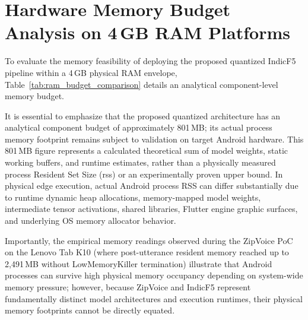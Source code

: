 \section{Hardware Memory Budget Analysis on \texorpdfstring{4\,GB}{4 GB} RAM Platforms}
To evaluate the memory feasibility of deploying the proposed quantized IndicF5 pipeline within a 4\,GB physical RAM envelope, Table~\ref{tab:ram_budget_comparison} details an analytical component-level memory budget. 

It is essential to emphasize that the proposed quantized architecture has an analytical component budget of approximately 801\,MB; its actual process memory footprint remains subject to validation on target Android hardware. This 801\,MB figure represents a calculated theoretical sum of model weights, static working buffers, and runtime estimates, rather than a physically measured process Resident Set Size (\acrshort{rss}) or an experimentally proven upper bound. In physical edge execution, actual Android process RSS can differ substantially due to runtime dynamic heap allocations, memory-mapped model weights, intermediate tensor activations, shared libraries, Flutter engine graphic surfaces, and underlying OS memory allocator behavior.

Importantly, the empirical memory readings observed during the ZipVoice PoC on the Lenovo Tab K10 (where post-utterance resident memory reached up to 2,491\,MB without LowMemoryKiller termination) illustrate that Android processes can survive high physical memory occupancy depending on system-wide memory pressure; however, because ZipVoice and IndicF5 represent fundamentally distinct model architectures and execution runtimes, their physical memory footprints cannot be directly equated.

